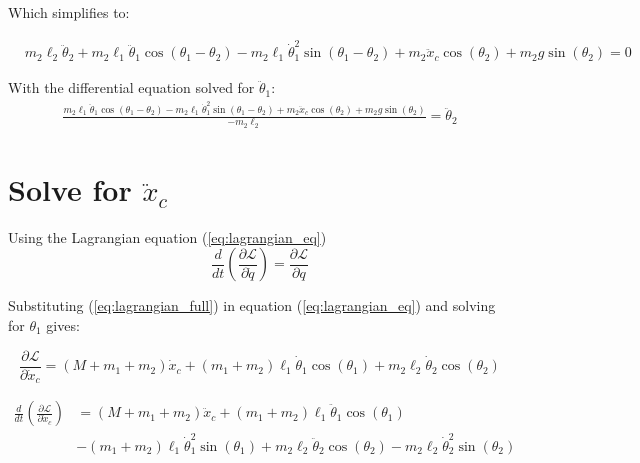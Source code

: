 \documentclass[10pt]{article}
\begin{document}
    Which simplifies to:

    \begin{equation}
        \begin{aligned}
            &m_2\ell_2 \ddot \theta_2 + m_2 \ell_1  \ddot \theta_1 \cos(\theta_1 - \theta_2) - m_2 \ell_1\dot \theta_1^2 \sin(\theta_1 - \theta_2)+ m_2 \ddot x_c  \cos(\theta_2) +m_2g\sin(\theta_2) =0
        \end{aligned}
    \end{equation}  

    With the differential equation solved for $\ddot \theta_1$:
    \begin{equation}
        \begin{aligned}
            \frac{m_2 \ell_1  \ddot \theta_1 \cos(\theta_1 - \theta_2) - m_2 \ell_1\dot \theta_1^2 \sin(\theta_1 - \theta_2)+ m_2 \ddot x_c  \cos(\theta_2) +m_2g\sin(\theta_2)}{-m_2 \ell_2} = \ddot \theta_2
        \end{aligned}
    \end{equation}  



    \pagebreak
    \section{Solve for $\ddot x_c$}
    Using the Lagrangian equation (\ref{eq:lagrangian_eq})
    \begin{equation} \label{eq:lagrangian_eq}
        \frac{d}{dt} \left(\frac{\partial \mathcal{L}}{\partial \dot q} \right) = 
        \frac{\partial \mathcal{L}}{\partial q}
    \end{equation}

    Substituting (\ref{eq:lagrangian_full}) in equation (\ref{eq:lagrangian_eq}) and solving for $\theta_1$ gives:

    \begin{equation} \label{eq: lagrange Step1}
        \frac{\partial \mathcal{L}}{\partial \dot x_c} = (M + m_1 + m_2)\dot x_c + (m_1 + m_2)\ell_1\dot\theta_1\cos(\theta_1) + m_2\ell_2\dot\theta_2\cos(\theta_2)
    \end{equation}

    \begin{equation} \label{eq: lagrange Step2}
        \begin{aligned}
        \frac{d}{dt} \left(\frac{\partial \mathcal{L}}{\partial \dot x_c}\right) &= (M + m_1 + m_2)\ddot x_c +  (m_1 + m_2)\ell_1\ddot\theta_1\cos(\theta_1)\\
         &- (m_1 + m_2)\ell_1\dot\theta_1^2\sin(\theta_1) + m_2\ell_2\ddot\theta_2\cos(\theta_2) - m_2\ell_2\dot\theta_2^2\sin(\theta_2)
        \end{aligned}
    \end{equation}
\end{document}
